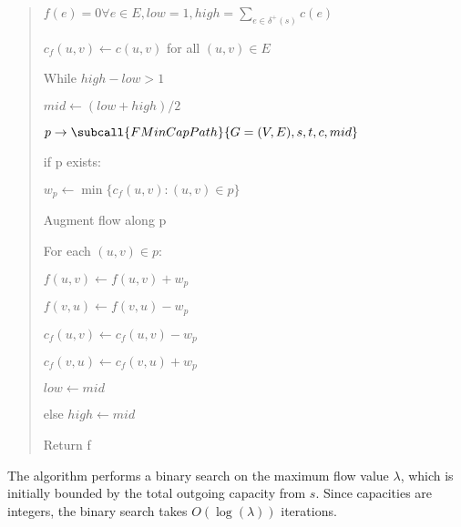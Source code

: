 \documentclass{article}
\begin{document}
\begin{solution}
\begin{quote}%

\begin{steps}
    \item $f(e) =0 \forall e\in E, low =1,high=\sum_{e\in \delta^+(s)} c(e)$
    \item $c_f(u,v) \leftarrow c(u,v)$ for all $(u,v) \in E$ 
    \item While $high-low > 1$
    \begin{steps}
        \item $mid \leftarrow (low+high)/2$
        \item $p\rightarrow \subcall{FMinCapPath}{G=(V,E),s,t,c,mid}$
        \item if p exists:
        \begin{steps}
            \item $w_p \leftarrow \min\{c_f(u,v) : (u,v) \in p\}$ 
            \item Augment flow along p
            \item For each $(u,v)\in p$:
            \begin{steps}

            \item $f(u,v) \leftarrow f(u,v) + w_p$
            \item $f(v,u) \leftarrow f(v,u) - w_p$
            \item $c_f(u,v) \leftarrow c_f(u,v) - w_p$
            \item $c_f(v,u) \leftarrow c_f(v,u) + w_p$

            \end{steps}

            \item $low \leftarrow mid$ 

        \end{steps}
        \item else $high \leftarrow mid$

    \end{steps}
    \item Return f
    \end{steps}
\end{quote}

\begin{subproof}[Runtime]
The algorithm performs a binary search on the maximum flow value $\lambda$, which is initially bounded by the total outgoing capacity from $s$. Since capacities are integers, the binary search takes $O(\log(\lambda))$ iterations.


\end{subproof}
\end{solution}
\end{document}
